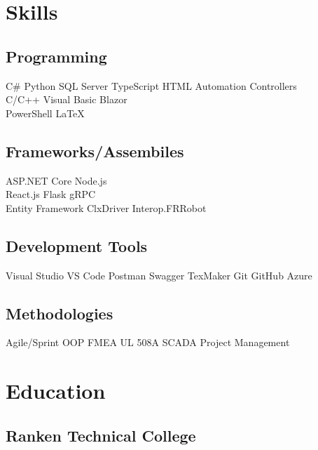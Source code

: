 \documentclass{TaylorTurnerResume2023}
\begin{document}
\hfill
\begin{minipage}[t]{0.275\textwidth} 

\section{Skills}
\subsection{Programming}
\sectionsep
{}
C\# \textbullet{} Python \textbullet{} SQL Server \textbullet{} TypeScript \textbullet{} HTML \textbullet{} Automation Controllers\\
\sectionsep
{}
C/C++ \textbullet{} Visual Basic \textbullet{} Blazor \textbullet{}\\
PowerShell \textbullet{} \LaTeX\\
\sectionsep
\sectionsep
\subsection{Frameworks/Assembiles}
\sectionsep
ASP.NET Core \textbullet{} Node.js \textbullet{}\\
React.js \textbullet{} Flask \textbullet{} gRPC \textbullet{}\\
Entity Framework \textbullet{} ClxDriver \textbullet{} Interop.FRRobot
\sectionsep
\sectionsep
\subsection{Development Tools}
\sectionsep
Visual Studio \textbullet{} VS Code \textbullet{} Postman \textbullet{} Swagger \textbullet{} TexMaker \textbullet{} Git \textbullet{} GitHub \textbullet{} Azure\\
\sectionsep
\subsection{Methodologies}
\sectionsep
Agile/Sprint \textbullet{} OOP \textbullet{} FMEA \textbullet{} UL 508A \textbullet{} SCADA \textbullet{} Project Management\\
\sectionsep


\section{Education} 
\subsection{Ranken Technical College}


\end{minipage}
\end{document}

